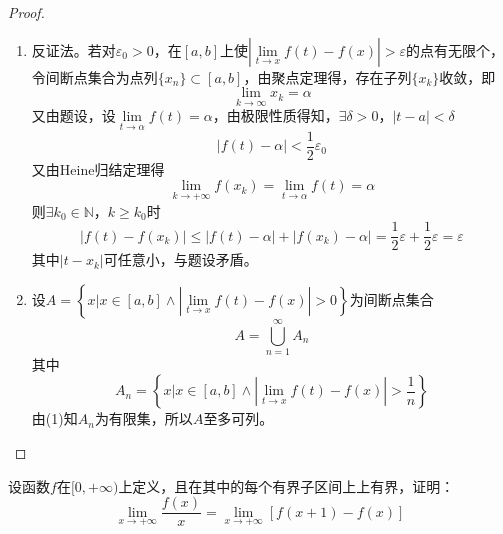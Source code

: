 \begin{proof}

    \begin{enumerate}

        \item
            反证法。若对$\varepsilon_0 > 0$，在$[a,b]$上使$\left| \lim\limits_{t \to x}{f(t) - f(x)} \right| > \varepsilon$的点有无限个，\\
            令间断点集合为点列$\{x_n\} \subset [a,b]$，由聚点定理得，存在子列$\{x_k\}$收敛，即
            $$\lim_{k \to \infty}{x_k} = \alpha $$
            又由题设，设$\lim\limits_{t\to \alpha}{f(t)} = \alpha$，由极限性质得知，$\exists \delta > 0$，$|t- a| < \delta$
            $$|f(t) - \alpha| < \dfrac{1}{2} \varepsilon_0$$
            又由\textup{Heine}归结定理得
            $$\lim_{k \to +\infty}{f(x_k)} = \lim\limits_{t\to \alpha}{f(t)} = \alpha$$
            则$\exists k_0 \in \mathbb{N}$，$k \geq k_0$时
            $$|f(t) - f(x_k)| \leq |f(t) - \alpha| + |f(x_k) - \alpha| = \dfrac{1}{2} \varepsilon + \dfrac{1}{2} \varepsilon = \varepsilon$$
            其中$|t - x_k|$可任意小，与题设矛盾。
        
        \item 
            设$A = \left\{x \Big| x \in [a,b] \land \left| \lim\limits_{t \to x}{f(t) - f(x)} \right| > 0 \right\}$为间断点集合
            $$A = \bigcup_{n=1}^{\infty}{A_n}$$
            其中
            $$A_n = \left\{x \Big| x \in [a,b] \land \left| \lim\limits_{t \to x}{f(t) - f(x)} \right| > \dfrac{1}{n} \right\}$$
            由\textup{(1)}知$A_n$为有限集，所以$A$至多可列。

    \end{enumerate}

\end{proof}

\begin{proposition}

    设函数$f$在$[0,+\infty)$上定义，且在其中的每个有界子区间上上有界，证明：
    $$\lim_{x \to +\infty}{\dfrac{f(x)}{x}} = \lim_{x \to +\infty}{[f(x+1) - f(x)]}$$

\end{proposition}

